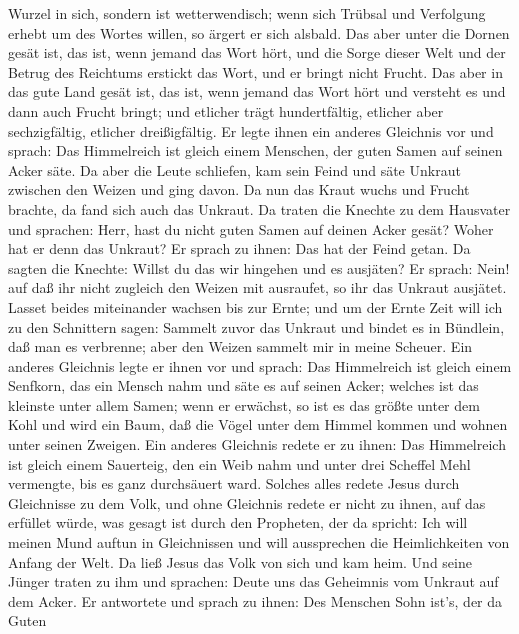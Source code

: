 Wurzel in sich, sondern ist wetterwendisch; wenn sich Trübsal und
Verfolgung erhebt um des Wortes willen, so ärgert er sich alsbald.
 Das aber unter die Dornen gesät ist, das ist, wenn jemand
das Wort hört, und die Sorge dieser Welt und der Betrug des Reichtums
erstickt das Wort, und er bringt nicht Frucht.  Das aber in
das gute Land gesät ist, das ist, wenn jemand das Wort hört und versteht
es und dann auch Frucht bringt; und etlicher trägt hundertfältig,
etlicher aber sechzigfältig, etlicher dreißigfältig.  Er
legte ihnen ein anderes Gleichnis vor und sprach: Das Himmelreich ist
gleich einem Menschen, der guten Samen auf seinen Acker säte.
 Da aber die Leute schliefen, kam sein Feind und säte
Unkraut zwischen den Weizen und ging davon.  Da nun das
Kraut wuchs und Frucht brachte, da fand sich auch das Unkraut.
 Da traten die Knechte zu dem Hausvater und sprachen: Herr,
hast du nicht guten Samen auf deinen Acker gesät? Woher hat er denn das
Unkraut?  Er sprach zu ihnen: Das hat der Feind getan. Da
sagten die Knechte: Willst du das wir hingehen und es ausjäten?
 Er sprach: Nein! auf daß ihr nicht zugleich den Weizen mit
ausraufet, so ihr das Unkraut ausjätet.  Lasset beides
miteinander wachsen bis zur Ernte; und um der Ernte Zeit will ich zu den
Schnittern sagen: Sammelt zuvor das Unkraut und bindet es in Bündlein,
daß man es verbrenne; aber den Weizen sammelt mir in meine Scheuer.
 Ein anderes Gleichnis legte er ihnen vor und sprach: Das
Himmelreich ist gleich einem Senfkorn, das ein Mensch nahm und säte es
auf seinen Acker;  welches ist das kleinste unter allem
Samen; wenn er erwächst, so ist es das größte unter dem Kohl und wird
ein Baum, daß die Vögel unter dem Himmel kommen und wohnen unter seinen
Zweigen.  Ein anderes Gleichnis redete er zu ihnen: Das
Himmelreich ist gleich einem Sauerteig, den ein Weib nahm und unter drei
Scheffel Mehl vermengte, bis es ganz durchsäuert ward. 
Solches alles redete Jesus durch Gleichnisse zu dem Volk, und ohne
Gleichnis redete er nicht zu ihnen,  auf das erfüllet
würde, was gesagt ist durch den Propheten, der da spricht: Ich will
meinen Mund auftun in Gleichnissen und will aussprechen die
Heimlichkeiten von Anfang der Welt.  Da ließ Jesus das Volk
von sich und kam heim. Und seine Jünger traten zu ihm und sprachen:
Deute uns das Geheimnis vom Unkraut auf dem Acker.  Er
antwortete und sprach zu ihnen: Des Menschen Sohn ist's, der da Guten

